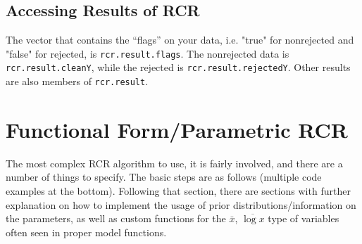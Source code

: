 \documentclass[12pt]{article}
\begin{document}
\subsection{Accessing Results of RCR}
\par The vector that contains the ``flags'' on your data, i.e. "true" for nonrejected and "false" for rejected, is \texttt{rcr.result.flags}. The nonrejected data is \texttt{rcr.result.cleanY}, while the rejected is \texttt{rcr.result.rejectedY}. Other results are also members of \texttt{rcr.result}.
\section{Functional Form/Parametric RCR}
The most complex RCR algorithm to use, it is fairly involved, and there are a number of things to specify. The basic steps are as follows (multiple code examples at the bottom). Following that section, there are sections with further explanation on how to implement the usage of prior distributions/information on the parameters, as well as custom functions for the $\bar{x}$, $\overline{\log x}$ type of variables often seen in proper model functions.
\end{document}
